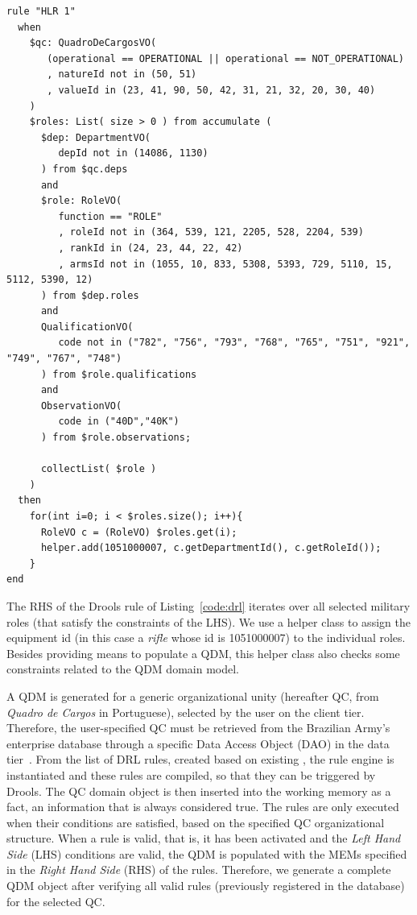 \begin{lstlisting}[frame=single, float=*t, language=DRL, caption=Example of a \emph{low-level Drools rule}, label={code:drl}]
rule "HLR 1"   	
  when
    $qc: QuadroDeCargosVO( 
       (operational == OPERATIONAL || operational == NOT_OPERATIONAL)
       , natureId not in (50, 51)
       , valueId in (23, 41, 90, 50, 42, 31, 21, 32, 20, 30, 40) 
    )	
    $roles: List( size > 0 ) from accumulate ( 
      $dep: DepartmentVO(
         depId not in (14086, 1130)
      ) from $qc.deps 
      and
      $role: RoleVO(
         function == "ROLE"
         , roleId not in (364, 539, 121, 2205, 528, 2204, 539) 
         , rankId in (24, 23, 44, 22, 42) 
         , armsId not in (1055, 10, 833, 5308, 5393, 729, 5110, 15, 5112, 5390, 12) 
      ) from $dep.roles 
      and  		
      QualificationVO(
         code not in ("782", "756", "793", "768", "765", "751", "921", "749", "767", "748")
      ) from $role.qualifications
      and
      ObservationVO(
         code in ("40D","40K")
      ) from $role.observations;
	
      collectList( $role )
    )	 		
  then		 
    for(int i=0; i < $roles.size(); i++){       	
      RoleVO c = (RoleVO) $roles.get(i);
      helper.add(1051000007, c.getDepartmentId(), c.getRoleId());
    }
end
\end{lstlisting}

The RHS of the Drools rule of Listing~\ref{code:drl} iterates over all selected military roles (that satisfy the constraints of the LHS). We use a helper class to assign the equipment id (in this case a \emph{rifle} whose id is 1051000007) to the individual roles. Besides providing means to populate a QDM, this helper class also checks some constraints related to the QDM domain model. 



A QDM is generated for a generic organizational unity (hereafter QC, from \emph{Quadro de Cargos} in Portuguese), selected by the user on the client tier. Therefore, the user-specified QC must be retrieved from the Brazilian Army's enterprise database through a specific Data Access Object (DAO) in the data tier~\cite{alur2003}. From the list of DRL rules, created based on existing \callers, the rule engine is instantiated and these rules are compiled, so that they can be triggered by Drools. The QC domain object is then inserted into the working memory as a fact, an information that is always considered true. The rules are only executed when their conditions are satisfied, based on the specified QC organizational structure. When a rule is valid, that is, it has been activated and the \emph{Left Hand Side} (LHS) conditions are valid, the QDM is populated with the MEMs specified in the \emph{Right Hand Side} (RHS) of the rules. Therefore, we generate a complete QDM object after verifying all valid rules (previously registered in the database) for the selected QC. 

